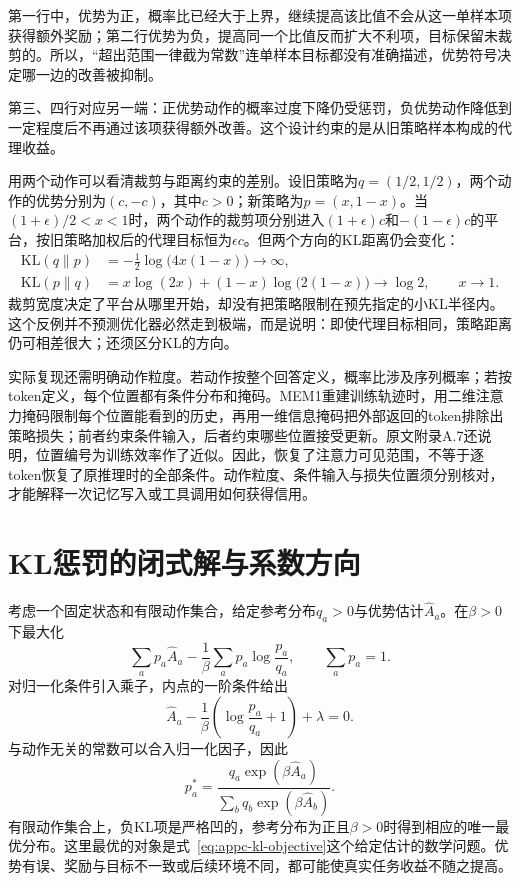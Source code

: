 第一行中，优势为正，概率比已经大于上界，继续提高该比值不会从这一单样本项获得额外奖励；第二行优势为负，提高同一个比值反而扩大不利项，目标保留未裁剪的。所以，“超出范围一律截为常数”连单样本目标都没有准确描述，优势符号决定哪一边的改善被抑制。

第三、四行对应另一端：正优势动作的概率过度下降仍受惩罚，负优势动作降低到一定程度后不再通过该项获得额外改善。这个设计约束的是从旧策略样本构成的代理收益。

用两个动作可以看清裁剪与距离约束的差别。设旧策略为$q=(1/2,1/2)$，两个动作的优势分别为$(c,-c)$，其中$c>0$；新策略为$p=(x,1-x)$。当$(1+\epsilon)/2<x<1$时，两个动作的裁剪项分别进入$(1+\epsilon)c$和$-(1-\epsilon)c$的平台，按旧策略加权后的代理目标恒为$\epsilon c$。但两个方向的KL距离仍会变化：
\begin{align*}
 \mathrm{KL}(q\|p)&=-\tfrac12\log\!\bigl(4x(1-x)\bigr)
       \longrightarrow\infty,\\
 \mathrm{KL}(p\|q)&=x\log(2x)+(1-x)\log\!\bigl(2(1-x)\bigr)
       \longrightarrow\log2,
 \qquad x\longrightarrow1.
\end{align*}
裁剪宽度决定了平台从哪里开始，却没有把策略限制在预先指定的小KL半径内。这个反例并不预测优化器必然走到极端，而是说明：即使代理目标相同，策略距离仍可相差很大；还须区分KL的方向。

实际复现还需明确动作粒度。若动作按整个回答定义，概率比涉及序列概率；若按token定义，每个位置都有条件分布和掩码。MEM1重建训练轨迹时，用二维注意力掩码限制每个位置能看到的历史，再用一维信息掩码把外部返回的token排除出策略损失；前者约束条件输入，后者约束哪些位置接受更新\cite{mem1-2506}。原文附录A.7还说明，位置编号为训练效率作了近似。因此，恢复了注意力可见范围，不等于逐token恢复了原推理时的全部条件。动作粒度、条件输入与损失位置须分别核对，才能解释一次记忆写入或工具调用如何获得信用。

\section{KL惩罚的闭式解与系数方向}

考虑一个固定状态和有限动作集合，给定参考分布$q_a>0$与优势估计$\widehat A_a$。在$\beta>0$下最大化
\begin{equation}
 \sum_a p_a\widehat A_a
 -\frac{1}{\beta}\sum_a p_a\log\frac{p_a}{q_a},
 \qquad \sum_a p_a=1.
 \label{eq:appc-kl-objective}
\end{equation}
对归一化条件引入乘子，内点的一阶条件给出
\begin{equation}
 \widehat A_a-\frac{1}{\beta}
  \left(\log\frac{p_a}{q_a}+1\right)+\lambda=0.
\end{equation}
与动作无关的常数可以合入归一化因子，因此
\begin{equation}
 p_a^*=\frac{q_a\exp(\beta\widehat A_a)}
 {\sum_b q_b\exp(\beta\widehat A_b)}.
\end{equation}
有限动作集合上，负KL项是严格凹的，参考分布为正且$\beta>0$时得到相应的唯一最优分布。这里最优的对象是式~\eqref{eq:appc-kl-objective}这个给定估计的数学问题。优势有误、奖励与目标不一致或后续环境不同，都可能使真实任务收益不随之提高。

